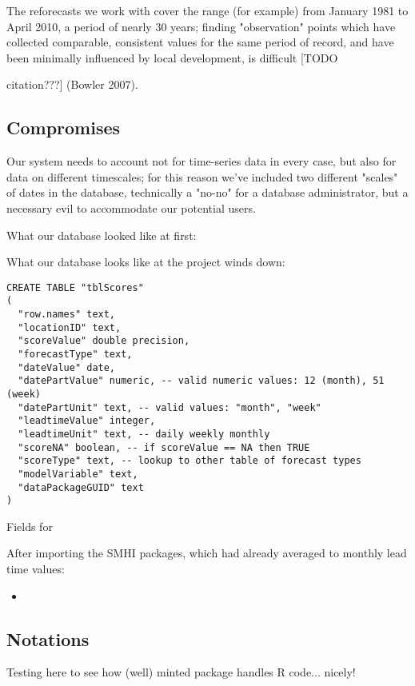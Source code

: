 \documentclass[logos,parttoc,morelanguage=french,morelanguage=italian]{orsay-memoire}
\begin{document}
The reforecasts we work with cover the range (for example) from January 1981 to April 2010, a period of nearly 30 years; finding "observation" points which have collected comparable, consistent values for the same period of record, and have been minimally influenced by local development, is difficult [TODO {citation???] (Bowler 2007). \cite{bowler2008accounting}

\subsection{Compromises}

Our system needs to account not for time-series data in every case, but also for data on different timescales; for this reason we've included two different "scales" of dates in the database, technically a "no-no" for a database administrator, but a necessary evil to accommodate our potential users.

What our database looked like at first:


What our database looks like at the project winds down:
\begin{verbatim}
CREATE TABLE "tblScores"
(
  "row.names" text,
  "locationID" text,
  "scoreValue" double precision,
  "forecastType" text,
  "dateValue" date,
  "datePartValue" numeric, -- valid numeric values: 12 (month), 51 (week)
  "datePartUnit" text, -- valid values: "month", "week"
  "leadtimeValue" integer,
  "leadtimeUnit" text, -- daily weekly monthly
  "scoreNA" boolean, -- if scoreValue == NA then TRUE
  "scoreType" text, -- lookup to other table of forecast types
  "modelVariable" text,
  "dataPackageGUID" text
)
\end{verbatim}

Fields for 


After importing the SMHI packages, which had already averaged to monthly lead time values:


\begin{itemize}
\item 
\end{itemize}



\subsection{Notations}

Testing here to see how (well) minted package handles R code... nicely!
\begin{verbatim}


\end{verbatim}}
\end{document}

